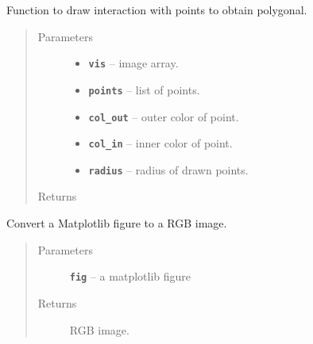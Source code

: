 \documentclass[letterpaper,10pt,english]{sphinxmanual}
\begin{document}
\begin{fulllineitems}
\label{RRtoolbox.lib:RRtoolbox.lib.image.drawcoorpolyline}
Function to draw interaction with points to obtain polygonal.
\begin{quote}\begin{description}
\item[{Parameters}] \leavevmode\begin{itemize}
\item {} 
\textbf{\texttt{vis}} -- image array.

\item {} 
\textbf{\texttt{points}} -- list of points.

\item {} 
\textbf{\texttt{col\_out}} -- outer color of point.

\item {} 
\textbf{\texttt{col\_in}} -- inner color of point.

\item {} 
\textbf{\texttt{radius}} -- radius of drawn points.

\end{itemize}

\item[{Returns}] \leavevmode


\end{description}\end{quote}

\end{fulllineitems}


\begin{fulllineitems}
\label{RRtoolbox.lib:RRtoolbox.lib.image.fig2bgr}
Convert a Matplotlib figure to a RGB image.
\begin{quote}\begin{description}
\item[{Parameters}] \leavevmode
\textbf{\texttt{fig}} -- a matplotlib figure

\item[{Returns}] \leavevmode
RGB image.

\end{description}\end{quote}

\end{fulllineitems}
\end{document}
